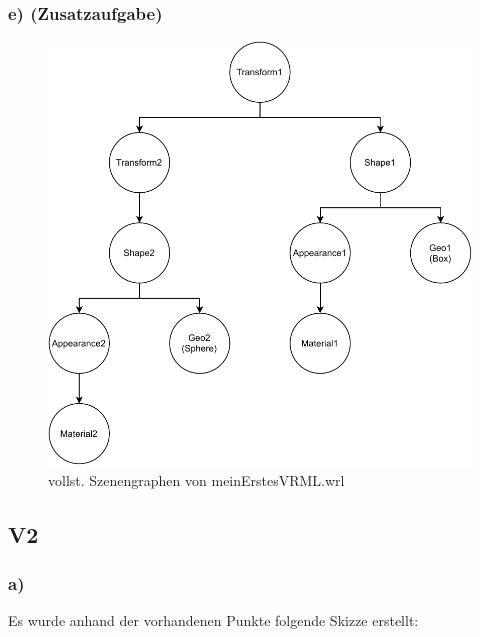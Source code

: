 \documentclass{article}
\begin{document}
\newpage 

\subsubsection*{e) (Zusatzaufgabe)}
\begin{figure}[!ht]
    \centering
    \includegraphics[scale=0.5]{V1_fullSceneGraph.pdf}
    \caption{vollst. Szenengraphen von meinErstesVRML.wrl}
\end{figure}

\subsection*{V2}
\subsubsection*{a)}
Es wurde anhand der vorhandenen Punkte folgende Skizze erstellt:
\end{document}
